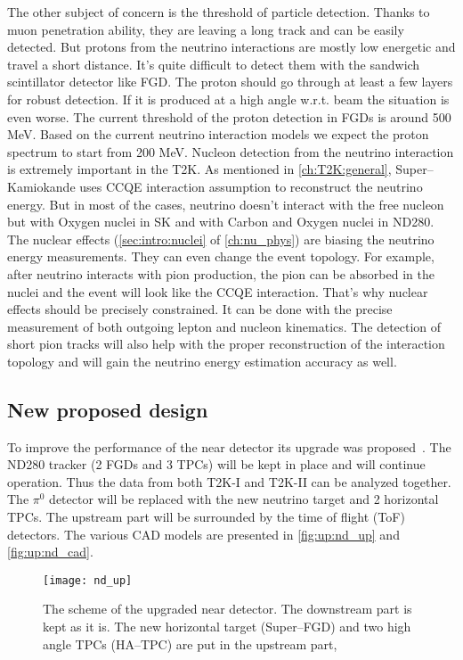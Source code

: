 \documentclass[main.tex]{subfiles}
\begin{document}
The other subject of concern is the threshold of particle detection. Thanks to muon penetration ability, they are leaving a long track and can be easily detected. But protons from the neutrino interactions are mostly low energetic and travel a short distance. It's quite difficult to detect them with the sandwich scintillator detector like FGD. The proton should go through at least a few layers for robust detection. If it is produced at a high angle w.r.t. beam the situation is even worse. The current threshold of the proton detection in FGDs is around 500 MeV. Based on the current neutrino interaction models we expect the proton spectrum to start from 200 MeV. Nucleon detection from the neutrino interaction is extremely important in the T2K. As mentioned in \autoref{ch:T2K:general}, Super--Kamiokande uses CCQE interaction assumption to reconstruct the neutrino energy. But in most of the cases, neutrino doesn't interact with the free nucleon but with Oxygen nuclei in SK and with Carbon and Oxygen nuclei in ND280. The nuclear effects (\autoref{sec:intro:nuclei} of \autoref{ch:nu_phys}) are biasing the neutrino energy measurements. They can even change the event topology. For example, after neutrino interacts with pion production, the pion can be absorbed in the nuclei and the event will look like the CCQE interaction. That's why nuclear effects should be precisely constrained. It can be done with the precise measurement of both outgoing lepton and nucleon kinematics. The detection of short pion tracks will also help with the proper reconstruction of the interaction topology and will gain the neutrino energy estimation accuracy as well.

\subsection{New proposed design}

To improve the performance of the near detector its upgrade was proposed~\cite{Abe2019}. The ND280 tracker (2 FGDs and 3 TPCs) will be kept in place and will continue operation. Thus the data from both T2K-I and T2K-II can be analyzed together. The $\pi^0$ detector will be replaced with the new neutrino target and 2 horizontal TPCs. The upstream part will be surrounded by the time of flight (ToF) detectors. The various CAD models are presented in \autoref{fig:up:nd_up} and \autoref{fig:up:nd_cad}.

\begin{figure}[!ht]
  \centering
  \texttt{[image: nd\_up]}
  \caption{The scheme of the upgraded near detector. The downstream part is kept as it is. The new horizontal target (Super--FGD) and two high angle TPCs (HA--TPC) are put in the upstream part,}
  \label{fig:up:nd_up}
\end{figure}
\end{document}

